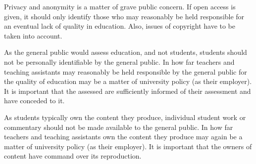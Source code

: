 Privacy and anonymity is a matter of grave public concern. If open access is
given, it should only identify those who may reasonably be held responsible for
an eventual lack of quality in education. Also, issues of copyright have to be
taken into account.

As the general public would assess education, and not students, students should
not be personally identifiable by the general public. In how far teachers and
teaching assistants may reasonably be held responsible by the general public
for the quality of education may be a matter of university policy (as their
employer). It is important that the assessed are sufficiently informed of their
assessment and have conceded to it.

As students typically own the content they produce, individual student work or
commentary should not be made available to the general public. In how far
teachers and teaching assistants own the content they produce may again be a
matter of university policy (as their employer). It is important that the
owners of content have command over its reproduction.

